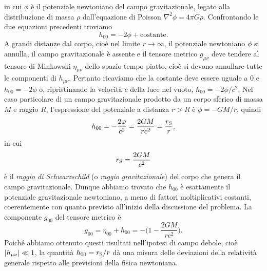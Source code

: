 in cui $\phi$ è il potenziale newtoniano del campo gravitazionale, legato alla
distribuzione di massa $\rho$
dall'equazione di
Poisson $\nabla^{2} \phi = 4\pi G\rho$.  Confrontando le due equazioni
precedenti troviamo
\begin{equation}
  h_{00} = -2\phi + \text{costante}.
\end{equation}
A grandi distanze dal corpo, cioè nel limite $r \to \infty$, il potenziale
newtoniano $\phi$ si annulla, il campo gravitazionale è assente e il tensore
metrico $g_{\mu\nu}$ deve tendere al tensore di Minkowski $\eta_{\mu\nu}$ dello
spazio-tempo piatto, cioè si devono annullare tutte le componenti di
$h_{\mu\nu}$.  Pertanto ricaviamo che la costante deve essere uguale a $0$ e
$h_{00} = -2\phi$ o, ripristinando la velocità $c$ della luce nel vuoto,
$h_{00} = -2\phi/c^{2}$.  Nel caso particolare di un campo gravitazionale
prodotto da un corpo sferico di massa $M$ e raggio $R$, l'espressione del
potenziale a distanza $r > R$ è $\phi = -GM/r$, quindi
\begin{equation}
  \label{eq:h00}
  h_{00} = -\frac{2\phi}{c^{2}} = \frac{2GM}{rc^{2}} = \frac{r_{\textup{S}}}{r},
\end{equation}
in cui
\begin{equation}
  r_{\textup{S}} = \frac{2GM}{c^{2}}
\end{equation}
è il \emph{raggio di Schwarzschild} (o
\emph{raggio gravitazionale}) del corpo che genera il campo gravitazionale.
Dunque abbiamo trovato che $h_{00}$ è esattamente il potenziale gravitazionale
newtoniano, a meno di fattori moltiplicativi costanti, coerentemente con quanto
previsto all'inizio della discussione del problema.  La componente $g_{00}$ del
tensore metrico è
\begin{equation}
  g_{00} = \eta_{00} + h_{00} = - \bigg(1 - \frac{2GM}{rc^{2}} \bigg).
\end{equation}
Poiché abbiamo ottenuto questi risultati nell'ipotesi di campo debole, cioè
$\lvert h_{\mu\nu}\rvert \ll 1$, la quantità $h_{00} = r_{\textup{S}}/r$ dà una misura
delle deviazioni della relatività generale rispetto alle previsioni della fisica
newtoniana.

